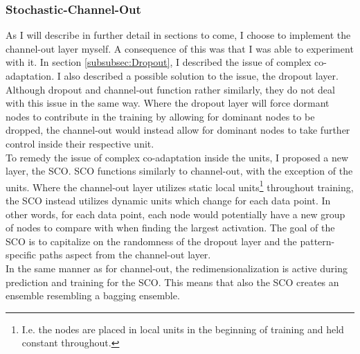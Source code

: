 \subsubsection*{Stochastic-Channel-Out}\label{subsubsec:stochchannelout}
As I will describe in further detail in sections to come, I choose to implement the channel-out layer myself. A consequence of this 
was that I was able to experiment with it. In section \ref{subsubsec:Dropout}, I described the issue of complex co-adaptation. I also described 
a possible solution to the issue, the dropout layer. Although dropout and channel-out function rather similarly, they do not deal 
with this issue in the same way. Where the dropout layer will force dormant nodes to contribute in the training by allowing for dominant
nodes to be dropped, the channel-out would instead allow for dominant nodes to take further control inside their respective unit.
\\
To remedy the issue of complex co-adaptation inside the units, I proposed a new layer, the \acf{SCO}. \ac{SCO} functions similarly to channel-out, 
with the exception of the units. Where the channel-out layer utilizes static local units\footnote{I.e. the nodes are placed in local units in the beginning of 
training and held constant throughout.} throughout training, the \ac{SCO} instead utilizes dynamic units which change for each data point. In other words, 
for each data point, each node would potentially have a new group of nodes to compare with when finding the largest activation.
The goal of the \ac{SCO} is to capitalize on the randomness of the dropout layer and the pattern-specific paths aspect from the 
channel-out layer.
\\  
In the same manner as for channel-out, the redimensionalization is active during prediction and training for the \ac{SCO}. This 
means that also the \ac{SCO} creates an ensemble resembling a bagging ensemble.
